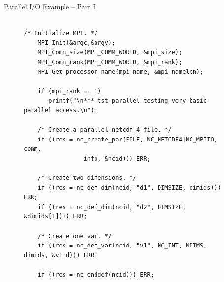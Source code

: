 \documentclass[compress,11pt,xcolor=svgnames,aspectratio=169]{beamer}
\begin{document}
\begin{frame}[fragile]{Parallel I/O Example -- Part I}

\begin{figure}
\centering
\begin{varwidth}{\linewidth}
{ \tiny

\begin{verbatim}

/* Initialize MPI. */
    MPI_Init(&argc,&argv);
    MPI_Comm_size(MPI_COMM_WORLD, &mpi_size);
    MPI_Comm_rank(MPI_COMM_WORLD, &mpi_rank);
    MPI_Get_processor_name(mpi_name, &mpi_namelen);

    if (mpi_rank == 1)
       printf("\n*** tst_parallel testing very basic parallel access.\n");

    /* Create a parallel netcdf-4 file. */
    if ((res = nc_create_par(FILE, NC_NETCDF4|NC_MPIIO, comm,
			     info, &ncid))) ERR;

    /* Create two dimensions. */
    if ((res = nc_def_dim(ncid, "d1", DIMSIZE, dimids))) ERR;
    if ((res = nc_def_dim(ncid, "d2", DIMSIZE, &dimids[1]))) ERR;

    /* Create one var. */
    if ((res = nc_def_var(ncid, "v1", NC_INT, NDIMS, dimids, &v1id))) ERR;

    if ((res = nc_enddef(ncid))) ERR;

\end{verbatim}

}
\end{varwidth}
\end{figure}

\end{frame}
\end{document}
